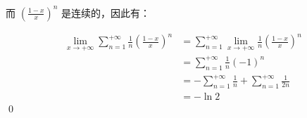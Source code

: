 而 $\displaystyle \left(\frac{1-x}{x}\right)^{n}$ 是连续的，因此有：


\begin{align*}
	\lim _{x\rightarrow +\infty }\sum _{n=1}^{+\infty }\frac{1}{n}\left(\frac{1-x}{x}\right)^{n} & =\sum _{n=1}^{+\infty }\lim _{x\rightarrow +\infty }\frac{1}{n}\left(\frac{1-x}{x}\right)^{n}\\
	& =\sum _{n=1}^{+\infty }\frac{1}{n}( -1)^{n}\\
	& =-\sum _{n=1}^{+\infty }\frac{1}{n} +\sum _{n=1}^{+\infty }\frac{1}{2n}\\
	& =-\ln 2
\end{align*}
\qed 




\ifx\allfiles\undefined

\fi